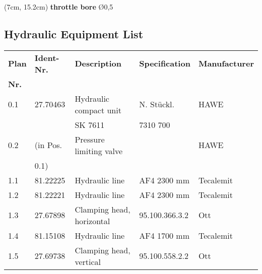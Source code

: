 \begin{textblock*}{\textwidth}(7cm, 15.2cm)
    \textbf{throttle bore} \O0,5
\end{textblock*}

\vspace{1cm}

\subsection{Hydraulic Equipment List}

\begin{table}[h]
    \centering
    \begin{tabularx}{\textwidth}{|l|l|l|l|l|}
        \hline
        \textbf{Plan}   & \textbf{Ident-Nr.}    & \textbf{Description}      & \textbf{Specification}    & \textbf{Manufacturer} \\
        \textbf{Nr.}    &                       &                           &                           &                       \\
        \hline
        \hline
        0.1             & 27.70463              & Hydraulic compact unit     & N. Stückl.               & HAWE                  \\
                        &                       & SK 7611                    & 7310 700                 &                       \\
        0.2             & (in Pos.              & Pressure limiting valve    &                          & HAWE                  \\
                        & 0.1)                  &                            &                          &                       \\
        1.1             & 81.22225              & Hydraulic line             & AF4 2300 mm              & Tecalemit             \\
        1.2             & 81.22221              & Hydraulic line             & AF4 2300 mm              & Tecalemit             \\
        1.3             & 27.67898              & Clamping head, horizontal  & 95.100.366.3.2           & Ott                   \\
        1.4             & 81.15108              & Hydraulic line             & AF4 1700 mm              & Tecalemit             \\
        1.5             & 27.69738              & Clamping head, vertical    & 95.100.558.2.2           & Ott                   \\
        \hline
    \end{tabularx}
    \label{tab:hydraulic_list}
\end{table}

